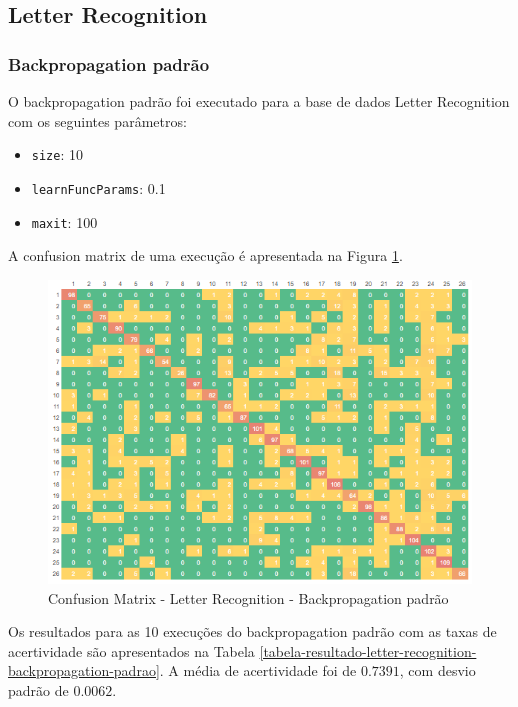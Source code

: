 \subsection{Letter Recognition}

\subsubsection{Backpropagation padrão}

O backpropagation padrão foi executado para a base de dados Letter Recognition com os seguintes parâmetros:

\begin{itemize}
	\item \texttt{size}: 10
	\item \texttt{learnFuncParams}: 0.1
	\item \texttt{maxit}: 100
\end{itemize}

A confusion matrix de uma execução é apresentada na Figura \ref{figura-confusion-matrix-letter-recognition-backpropagation-padrao}.

\begin{figure}[h!]
  \includegraphics[width=\linewidth]{figs/confusion-matrix-letter-recognition-backpropagation-padrao.png}
  \caption{Confusion Matrix - Letter Recognition - Backpropagation padrão}
  \label{figura-confusion-matrix-letter-recognition-backpropagation-padrao}
\end{figure}

Os resultados para as 10 execuções do backpropagation padrão com as taxas de acertividade são apresentados na Tabela \ref{tabela-resultado-letter-recognition-backpropagation-padrao}. A média de acertividade foi de $0.7391$, com desvio padrão de $0.0062$.

